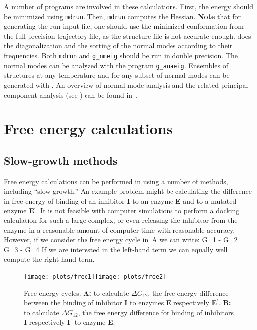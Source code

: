 A number of {\gromacs} programs are involved in these
calculations. First, the energy should be minimized using {\tt mdrun}.
Then, {\tt mdrun} computes the Hessian.  {\bf Note} that for generating
the run input file, one should use the minimized conformation from
the full precision trajectory file, as the structure file is not
accurate enough.
{\tt {}} does the diagonalization and
the sorting of the normal modes according to their frequencies.
Both {\tt mdrun} and {\tt g_nmeig} should be run in double precision.
The normal modes can be analyzed with the program {\tt g_anaeig}.
Ensembles of structures at any temperature and for any subset of
normal modes can be generated with {\tt {}}.
An overview of normal-mode analysis and the related principal component
analysis (see ) can be found in~\cite{Hayward95b}.


\section{Free energy calculations}
\label{sec:fecalc}
\subsection{Slow-growth methods}
Free energy calculations can be performed
in {\gromacs} using  a number of methods, including ``slow-growth.'' An example problem 
might be calculating the difference in free energy of binding of an inhibitor {\bf I}
to an enzyme {\bf E} and to a mutated enzyme {\bf E$^{\prime}$}. It 
is not feasible with computer simulations to perform a docking
calculation for such a large complex, or even releasing the inhibitor from
the enzyme in a reasonable amount of computer time with reasonable accuracy.
However, if we consider the free energy cycle in~A
we can write:
\beq
\Delta G_1 - \Delta G_2 =       \Delta G_3 - \Delta G_4
\label{eqn:ddg}
\eeq
If we are interested in the left-hand term we can equally well compute
the right-hand term.
\begin{figure}
\centerline{\texttt{[image: plots/free1]}\hspace{2cm}\texttt{[image: plots/free2]}}
\caption[Free energy cycles.]{Free energy cycles. {\bf A:} to
calculate $\Delta G_{12}$, the free energy difference between the
binding of inhibitor {\bf I} to enzymes {\bf E} respectively {\bf
E$^{\prime}$}. {\bf B:} to calculate $\Delta G_{12}$, the free energy
difference for binding of inhibitors {\bf I} respectively {\bf I$^{\prime}$} to
enzyme {\bf E}.}
\label{fig:free}
\end{figure}

